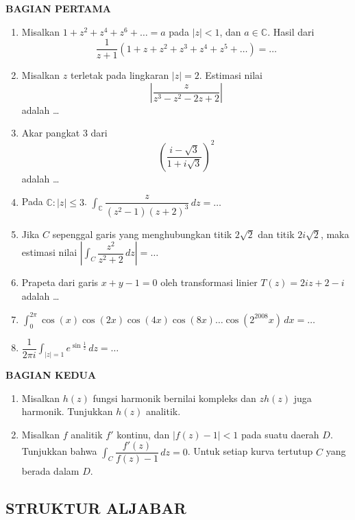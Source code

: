 \documentclass[12pt,twoside]{article}
\begin{document}
\textbf{BAGIAN PERTAMA}
\begin{enumerate}
	\item Misalkan $1+z^2+z^4+z^6+\dots=a$ pada $|z|<1$, dan $a\in\mathbb{C}$. Hasil dari $$\dfrac{1}{z+1}\left(1+z+z^2+z^3+z^4+z^5+\dots\right)=\dots$$
	\item Misalkan $z$ terletak pada lingkaran $|z|=2$. Estimasi nilai
	      $$\left|\dfrac{z}{z^3-z^2-2z+2}\right|$$
	      adalah \dots

	\item Akar pangkat 3 dari $$\left(\dfrac{i-\sqrt{3}}{1+i\sqrt{3}}\right)^2$$adalah \dots

	\item Pada $\mathbb{C}:|z|\leq 3$. $\displaystyle \int_{\mathbb{C}}\dfrac{z}{(z^2-1)(z+2)^3}\,dz=\dots$

	\item Jika $C$ sepenggal garis yang menghubungkan titik $2\sqrt{2}$ dan titik $2i\sqrt{2}$, maka estimasi nilai $\left|\displaystyle \int_{C}\dfrac{z^2}{z^2+2}\,dz\right|=\dots$

	\item Prapeta dari garis $x+y-1=0$ oleh transformasi linier $T(z)=2iz+2-i$ adalah \dots

	\item $\displaystyle\int_{0}^{2\pi}\cos(x)\cos(2x)\cos(4x)\cos(8x)\dots\cos(2^{2008}x)\,dx=\dots$

	\item $\displaystyle \dfrac{1}{2\pi i}\int_{|z|=1}e^{\sin \frac{1}{z}}\,dz=\dots$

\end{enumerate}

\newpage \textbf{BAGIAN KEDUA}
\begin{enumerate}
	\item Misalkan $h(z)$ fungsi harmonik bernilai kompleks dan $zh(z)$ juga harmonik. Tunjukkan $h(z)$ analitik.

	\item Misalkan $f$ analitik $f'$ kontinu, dan $|f(z)-1|<1$ pada suatu daerah $D$. Tunjukkan bahwa $\displaystyle \int_{C}\dfrac{f'(z)}{f(z)-1}\,dz=0$. Untuk setiap kurva tertutup $C$ yang berada dalam $D$.


\end{enumerate}

\newpage \subsection{STRUKTUR ALJABAR}
\end{document}
